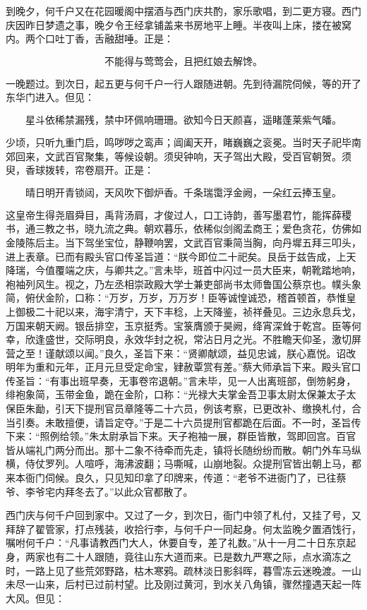 到晚夕，何千户又在花园暖阁中摆酒与西门庆共酌，家乐歌唱，到二更方寝。西门庆因昨日梦遗之事，晚夕令王经拿铺盖来书房地平上睡。半夜叫上床，搂在被窝内。两个口吐丁香，舌融甜唾。正是：

\[
不能得与莺莺会，且把红娘去解馋。
\]

一晚题过。到次日，起五更与何千户一行人跟随进朝。先到待漏院伺候，等的开了东华门进入。但见：

\[
星斗依稀禁漏残，禁中环佩响珊珊。
欲知今日天颜喜，遥睹蓬莱紫气皤。
\]

少顷，只听九重门启，鸣哕哕之鸾声；阊阖天开，睹巍巍之衮冕。当时天子祀毕南郊回来，文武百官聚集，等候设朝。须臾钟响，天子驾出大殿，受百官朝贺。须臾，香球拨转，帘卷扇开。正是：

\[
晴日明开青锁闼，天风吹下御炉香。
千条瑞霭浮金阙，一朵红云捧玉皇。
\]

这皇帝生得尧眉舜目，禹背汤肩，才俊过人，口工诗韵，善写墨君竹，能挥薛稷书，通三教之书，晓九流之典。朝欢暮乐，依稀似剑阁孟商王；爱色贪花，仿佛如金陵陈后主。当下驾坐宝位，静鞭响罢，文武百官秉简当胸，向丹墀五拜三叩头，进上表章。已而有殿头官口传圣旨道：“朕今即位二十祀矣。艮岳于兹告成，上天降瑞，今值覆端之庆，与卿共之。”言未毕，班首中闪过一员大臣来，朝靴踏地响，袍袖列风生。视之，乃左丞相崇政殿大学士兼吏部尚书太师鲁国公蔡京也。幞头象简，俯伏金阶，口称：“万岁，万岁，万万岁！臣等诚惶诚恐，稽首顿首，恭惟皇上御极二十祀以来，海宇清宁，天下丰稔，上天降鉴，祯祥叠见。三边永息兵戈，万国来朝天阙。银岳排空，玉京挺秀。宝箓膺颁于昊阙，绛宵深耸于乾宫。臣等何幸，欣逢盛世，交际明良，永效华封之祝，常沾日月之光。不胜瞻天仰圣，激切屏营之至！谨献颂以闻。”良久，圣旨下来：“贤卿献颂，益见忠诚，朕心嘉悦。诏改明年为重和元年，正月元旦受定命宝，肄赦覃赏有差。”蔡大师承旨下来。殿头官口传圣旨：“有事出班早奏，无事卷帘退朝。”言未毕，见一人出离班部，倒笏躬身，绯袍象简，玉带金鱼，跪在金阶，口称：“光禄大夫掌金吾卫事太尉太保兼太子太保臣朱勔，引天下提刑官员章隆等二十六员，例该考察，已更改补、缴换札付，合当引奏。未敢擅便，请旨定夺。”于是二十六员提刑官都跪在后面。不一时，圣旨传下来：“照例给领。”朱太尉承旨下来。天子袍袖一展，群臣皆散，驾即回宫。百官皆从端礼门两分而出。那十二象不待牵而先走，镇将长随纷纷而散。朝门外车马纵横，侍仗罗列。人喧呼，海沸波翻；马嘶喊，山崩地裂。众提刑官皆出朝上马，都来本衙门伺候。良久，只见知印拿了印牌来，传道：“老爷不进衙门了，已往蔡爷、李爷宅内拜冬去了。”以此众官都散了。

西门庆与何千户回到家中。又过了一夕，到次日，衙门中领了札付，又挂了号，又拜辞了翟管家，打点残装，收拾行李，与何千户一同起身。何太监晚夕置酒饯行，嘱咐何千户：“凡事请教西门大人，休要自专，差了礼数。”从十一月二十日东京起身，两家也有二十人跟随，竟往山东大道而来。已是数九严寒之际，点水滴冻之时，一路上见了些荒郊野路，枯木寒鸦。疏林淡日影斜晖，暮雪冻云迷晚渡。一山未尽一山来，后村已过前村望。比及刚过黄河，到水关八角镇，骤然撞遇天起一阵大风。但见：

